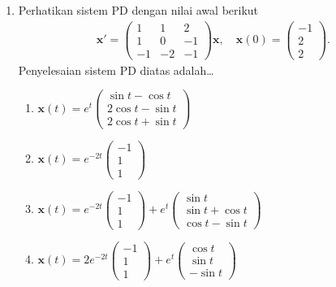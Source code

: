 \documentclass[a4paper]{article}
\theoremstyle{definisi}
\numberwithin{equation}{section}
\begin{document}
\begin{enumerate}
    \item Perhatikan sistem PD dengan nilai awal berikut
    \begin{align*}
      \mathbf{x'}=\begin{pmatrix}
        1&1&2\\
        1&0&-1\\
        -1&-2&-1
      \end{pmatrix}\mathbf{x},\quad \mathbf{x}(0)=\begin{pmatrix}
        -1\\2\\2
      \end{pmatrix}.
    \end{align*}
    Penyelesaian sistem PD diatas adalah\dots
    \begin{enumerate}[label=\Alph*.]
      \item $\mathbf{x}(t)=e^{t}\begin{pmatrix}\sin t - \cos t\\2\cos t -\sin t\\2\cos t + \sin t\end{pmatrix}$
      \item $\mathbf{x}(t)=e^{-2t}\begin{pmatrix}-1\\1\\1\end{pmatrix}$
      \item $\mathbf{x}(t)=e^{-2t}\begin{pmatrix}-1\\1\\1\end{pmatrix}+e^t\begin{pmatrix}\sin t\\\sin t+\cos t\\\cos t-\sin t\end{pmatrix}$
      \item $\mathbf{x}(t)=2e^{-2t}\begin{pmatrix}-1\\1\\1\end{pmatrix}+e^t\begin{pmatrix}\cos t\\\sin t\\-\sin t\end{pmatrix}$
    \end{enumerate}


\end{enumerate}
\end{document}
